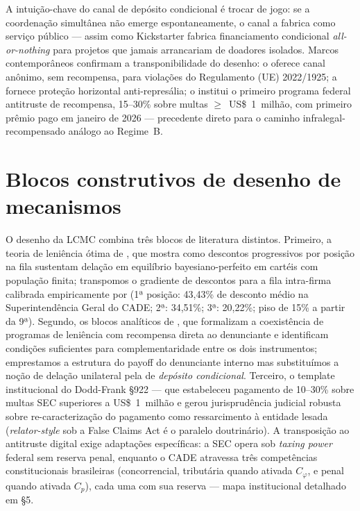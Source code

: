 \documentclass[12pt,a4paper]{article}
\begin{document}
A intuição-chave do canal de depósito condicional é trocar de jogo: se a
coordenação simultânea não emerge espontaneamente, o canal a fabrica como
serviço público --- assim como Kickstarter fabrica financiamento condicional
\emph{all-or-nothing} para projetos que jamais arrancariam de doadores isolados.
Marcos contemporâneos confirmam a transponibilidade do desenho: o
\citet{dmatool2024} oferece canal anônimo, sem recompensa, para violações do
Regulamento (UE) 2022/1925; a \citet{directive20191937} fornece proteção horizontal
anti-represália; o \citet{dojatr2025} institui o primeiro programa federal
antitruste de recompensa, 15--30\% sobre multas $\geq$~US\$~1~milhão, com primeiro
prêmio pago em janeiro de 2026 --- precedente direto para o caminho
infralegal-recompensado análogo ao Regime~B.

\section{Blocos construtivos de desenho de mecanismos}

O desenho da LCMC combina três blocos de literatura distintos. Primeiro, a teoria
de leniência ótima de \citet{spagnolo2004divide}, que mostra como descontos
progressivos por posição na fila sustentam delação em equilíbrio bayesiano-perfeito
em cartéis com população finita; transpomos o gradiente de descontos para a fila
intra-firma calibrada empiricamente por \citet{saito2021tcc} (1ª posição: 43,43\%
de desconto médio na Superintendência Geral do CADE; 2ª: 34,51\%; 3ª: 20,22\%; piso
de 15\% a partir da 9ª). Segundo, os blocos analíticos de
\citet{aubert2006impact}, que formalizam a coexistência de programas de leniência
com recompensa direta ao denunciante e identificam condições suficientes para
complementaridade entre os dois instrumentos; emprestamos a estrutura do payoff do
denunciante interno mas substituímos a noção de delação unilateral pela de
\emph{depósito condicional}. Terceiro, o template institucional do Dodd-Frank \S922
\citep{doddfrank922} --- que estabeleceu pagamento de 10--30\% sobre multas
SEC superiores a US\$~1~milhão e gerou jurisprudência judicial robusta sobre
re-caracterização do pagamento como ressarcimento à entidade lesada
(\emph{relator-style} sob a False Claims Act é o paralelo doutrinário). A
transposição ao antitruste digital exige adaptações específicas: a SEC opera sob
\emph{taxing power} federal sem reserva penal, enquanto o CADE atravessa três
competências constitucionais brasileiras (concorrencial, tributária quando ativada
$C_\varphi$, e penal quando ativada $C_p$), cada uma com sua reserva --- mapa institucional
detalhado em \S5.
\end{document}
